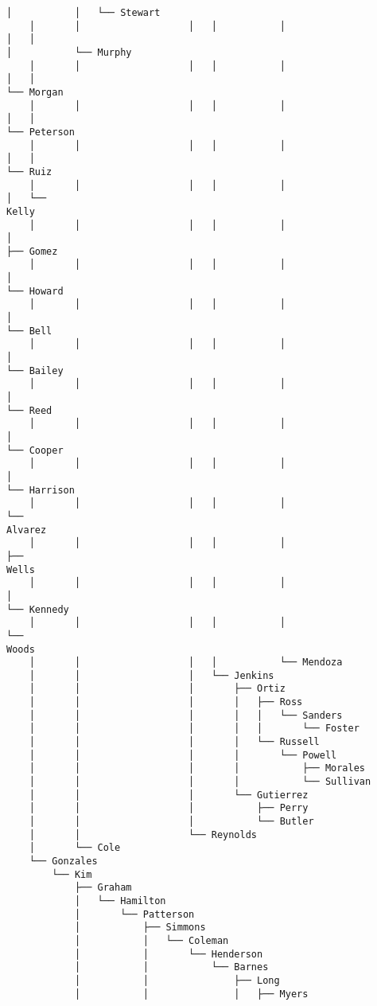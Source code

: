 \documentclass[11pt]{article}
\begin{document}
\begin{Verbatim}[commandchars=\\\{\}]
│           │   └── Stewart
    │       │                   │   │           │                       │   │
│           └── Murphy
    │       │                   │   │           │                       │   │
└── Morgan
    │       │                   │   │           │                       │   │
└── Peterson
    │       │                   │   │           │                       │   │
└── Ruiz
    │       │                   │   │           │                       │   └──
Kelly
    │       │                   │   │           │                       │
├── Gomez
    │       │                   │   │           │                       │
└── Howard
    │       │                   │   │           │                       │
└── Bell
    │       │                   │   │           │                       │
└── Bailey
    │       │                   │   │           │                       │
└── Reed
    │       │                   │   │           │                       │
└── Cooper
    │       │                   │   │           │                       │
└── Harrison
    │       │                   │   │           │                       └──
Alvarez
    │       │                   │   │           │                           ├──
Wells
    │       │                   │   │           │                           │
└── Kennedy
    │       │                   │   │           │                           └──
Woods
    │       │                   │   │           └── Mendoza
    │       │                   │   └── Jenkins
    │       │                   │       ├── Ortiz
    │       │                   │       │   ├── Ross
    │       │                   │       │   │   └── Sanders
    │       │                   │       │   │       └── Foster
    │       │                   │       │   └── Russell
    │       │                   │       │       └── Powell
    │       │                   │       │           ├── Morales
    │       │                   │       │           └── Sullivan
    │       │                   │       └── Gutierrez
    │       │                   │           ├── Perry
    │       │                   │           └── Butler
    │       │                   └── Reynolds
    │       └── Cole
    └── Gonzales
        └── Kim
            ├── Graham
            │   └── Hamilton
            │       └── Patterson
            │           ├── Simmons
            │           │   └── Coleman
            │           │       └── Henderson
            │           │           └── Barnes
            │           │               ├── Long
            │           │               │   ├── Myers

\end{Verbatim}
\end{document}
